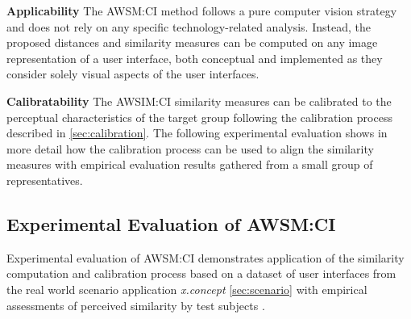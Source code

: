 \textbf{Applicability} The AWSM:CI method follows a pure computer vision strategy and does not rely on any specific technology-related analysis.
Instead, the proposed distances and similarity measures can be computed on any image representation of a user interface, both conceptual and implemented as they consider solely visual aspects of the user interfaces.

\textbf{Calibratability} The AWSIM:CI similarity measures can be calibrated to the perceptual characteristics of the target group following the calibration process described in \cref{sec:calibration}.
The following experimental evaluation shows in more detail how the calibration process can be used to align the similarity measures with empirical evaluation results gathered from a small group of representatives.

\hypertarget{sec:ci.experiment}{%
\subsection{Experimental Evaluation of AWSM:CI}\label{sec:ci.experiment}}

Experimental evaluation of AWSM:CI demonstrates application of the similarity computation and calibration process based on a dataset of user interfaces from the real world scenario application \emph{x.concept} \cref{sec:scenario} with empirical assessments of perceived similarity by test subjects \autocite{Heil2016Similarity}.

